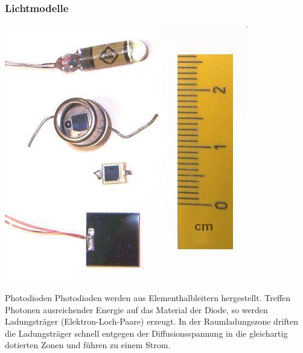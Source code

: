 \documentclass{beamer}
\begin{document}
\begin{frame}
    \frametitle{Lichtmodelle}
\framesubtitle{}
\begin{center}
\includegraphics[scale=0.9]{images/Fotodiode}
\end{center}
    \begin{block}{Photodioden}
Photodioden werden aus Elementhalbleitern hergestellt.
Treffen Photonen ausreichender Energie auf das Material der Diode, so werden Ladungsträger (Elektron-Loch-Paare) erzeugt. 
In der Raumladungszone driften die Ladungsträger schnell entgegen der Diffusionsspannung in die gleichartig dotierten Zonen und führen zu einem Strom. 
\end{block}
\end{frame}
\end{document}
